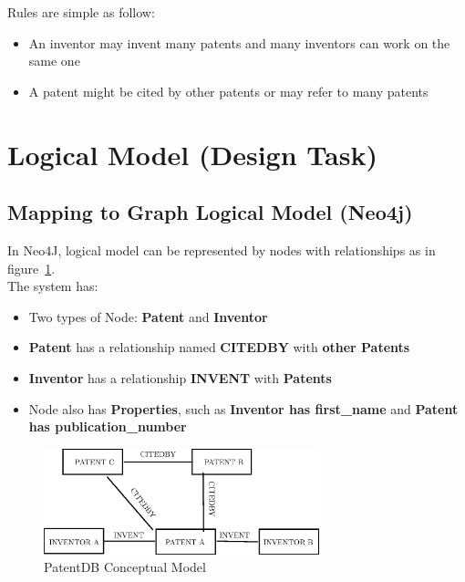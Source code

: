 \documentclass{article}
\begin{document}
Rules are simple as follow:
\begin{itemize}
  \item An inventor may invent many patents and many inventors can work on the same one
  \item A patent might be cited by other patents or may refer to many patents
\end{itemize}


\section{Logical Model (Design Task)}
\subsection{Mapping to Graph Logical Model (Neo4j)}
In Neo4J, logical model can be represented by nodes with relationships as in figure~\ref{fig:neo4j}.\\
The system has:
\begin{itemize}
\item Two types of Node: \textbf{Patent} and \textbf{Inventor}
\item \textbf{Patent} has a relationship named \textbf{CITEDBY} with \textbf{other Patents}
\item \textbf{Inventor} has a relationship \textbf{INVENT} with \textbf{Patents}
\item Node also has \textbf{Properties}, such as \textbf{Inventor has first\_name} and \textbf{Patent has publication\_number}
\end {itemize}

\begin{figure}[h!]
\centering
\includegraphics[width=80mm,scale=10]{neo4jgraph.eps}
\caption{ PatentDB Conceptual Model} \label{fig:neo4j}
\end{figure}
\end{document}
